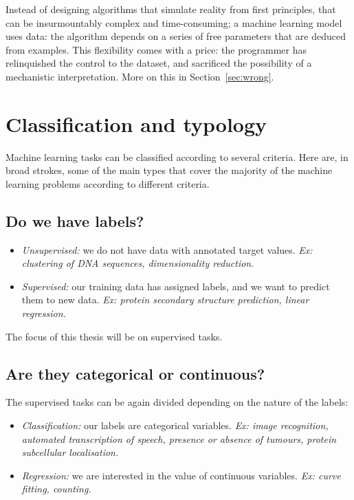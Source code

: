 Instead of designing algorithms that simulate reality from first principles, that can be insurmountably complex and time-consuming; a machine learning model uses data: the algorithm depends on a series of free parameters that are deduced from examples.
This flexibility comes with a price: the programmer has relinquished the control to the dataset, and sacrificed the possibility of a mechanistic interpretation.
More on this in Section~\ref{sec:wrong}.

\section{Classification and typology}
Machine learning tasks can be classified according to several criteria.
Here are, in broad strokes, some of the main types that cover the majority of the machine learning problems according to different criteria.

\subsection{Do we have labels?}
\begin{itemize}
\item \emph{Unsupervised:} we do not have data with annotated target values. \emph{Ex: clustering of DNA sequences, dimensionality reduction.}
\item \emph{Supervised:} our training data has assigned labels, and we want to predict them to new data. \emph{Ex: protein secondary structure prediction, linear regression.}
\end{itemize}

The focus of this thesis will be on supervised tasks.

\subsection[Categorical or continuous?]{Are they categorical or continuous?}
The supervised tasks can be again divided depending on the nature of the labels:
\begin{itemize}
\item \emph{Classification:} our labels are categorical variables. \emph{Ex: image recognition, automated transcription of speech, presence or absence of tumours, protein subcellular localisation.}
\item \emph{Regression:} we are interested in the value of continuous variables. \emph{Ex: curve fitting, counting.}
\end{itemize}

